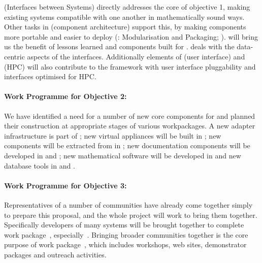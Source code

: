 \documentclass[noworkareas,deliverables,\classoptions]{euproposal}       %
\begin{document}
\begin{proposal}
 (Interfaces
between Systems) directly addresses the core of objective 1, making
existing systems compatible with one another in mathematically sound
ways. Other tasks in  (component
architecture) support this, by making components more portable and
easier to deploy (:
Modularisation and Packaging;
). 
will bring us the benefit of lessons learned and components built for
\SMC.  deals with the data-centric
aspects of the interfaces. Additionally elements of  (user interface) and  (HPC)
will also contribute to the framework with user interface pluggability
and interfaces optimised for HPC.

\paragraph{Work Programme for Objective 2: }

We have identified a need for a number of new core components for
\TheProject and planned their construction at appropriate stages of
various workpackages. A new adapter infrastructure is part of
; new virtual
appliances will be built in
; new components will be
extracted from \SMC in  ;
new documentation components will be developed in
 and ; new
mathematical software will be developed in 
and new database tools in  and .


\paragraph{Work Programme for Objective 3: }

Representatives of a number of communities have already come together
simply to prepare this proposal, and the whole project will work to
bring them together. Specifically developers of many systems  will be brought together to complete
work package~,
especially~.
Bringing broader communities together is the core purpose of
work package~, which includes workshops, web sites,
demonstrator packages and outreach activities.


\end{proposal}
\end{document}
